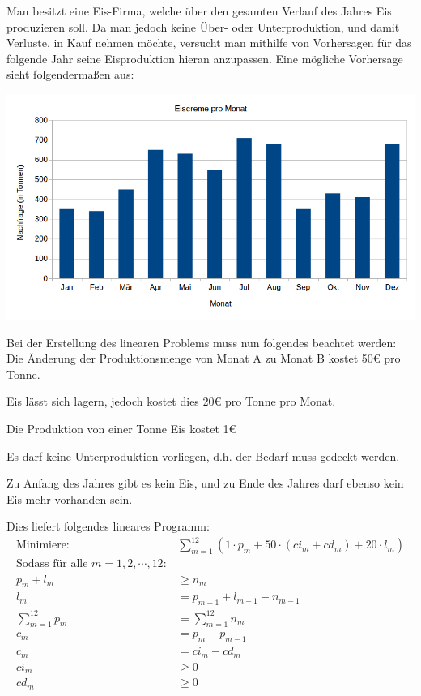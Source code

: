Man besitzt eine Eis-Firma, welche über den gesamten Verlauf des Jahres Eis produzieren soll. Da man jedoch keine Über- oder Unterproduktion, und damit Verluste, in Kauf nehmen möchte, versucht man mithilfe von Vorhersagen für das folgende Jahr seine Eisproduktion hieran anzupassen. Eine mögliche Vorhersage sieht folgendermaßen aus:

{{\centering
\includegraphics[width=\textwidth]{Grafiken/Eiscreme.png}}}

Bei der Erstellung des linearen Problems muss nun folgendes beachtet werden:
Die Änderung der Produktionsmenge von Monat A zu Monat B kostet 50€ pro Tonne.

Eis lässt sich lagern, jedoch kostet dies 20€ pro Tonne pro Monat.

Die Produktion von einer Tonne Eis kostet 1€

Es darf keine Unterproduktion vorliegen, d.h. der Bedarf muss gedeckt werden.

Zu Anfang des Jahres gibt es kein Eis, und zu Ende des Jahres darf ebenso kein Eis mehr vorhanden sein.

Dies liefert folgendes lineares Programm:
\begin{align*}
 \text{Minimiere:} &\sum_{m=1}^{12} (1 \cdot p_m + 50 \cdot (ci_m + cd_m) + 20 \cdot l_m) \\
 \text{Sodass für alle } m = 1, 2, \cdots ,12: \\
 p_m + l_m &\geq n_m  \\
 l_m &= p_{m-1} + l_{m-1} - n_{m-1} \\
 \sum_{m=1}^{12} p_m &= \sum_{m=1}^{12} n_m \\
 c_m &= p_{m} - p_{m-1} \\
 c_m &= ci_m - cd_m \\
 ci_m &\geq 0		\\
 cd_m &\geq 0
\end{align*}

